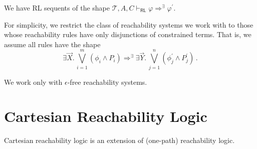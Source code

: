 \documentclass{article}
\newcommand{\RL}{\mathsf{RL}}
\begin{document}
\begin{definition}

We have RL sequents of the shape
$\mathcal{T}, A, C \vdash_\RL \varphi \Rightarrow^\exists \varphi^\prime$.

\end{definition}

\begin{remark}\label{rem:shapeOfReachabilityRules}
For simplicity, we restrict the class of reachability systems we work with to those whose reachability rules
have only disjunctions of constrained terms. That is, we assume all rules have the shape
\begin{equation*}
    \exists \vec{X}.\, \bigvee_{i=1}^{m} (\phi_i \land P_i) \Rightarrow^\exists \exists \vec{Y}.\, \bigvee_{j=1}^{n} (\phi^\prime_j \land P^\prime_j) \, .
\end{equation*}
\end{remark}

\begin{remark}\label{rem:noEmptySteps}
We work only with $\epsilon$-free reachability systems.
\end{remark}

\section{Cartesian Reachability Logic}
Cartesian reachability logic is an extension of (one-path) reachability logic.
\end{document}
